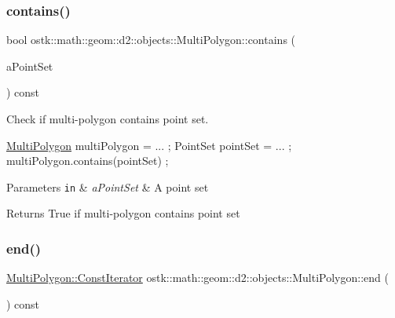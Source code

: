 \subsubsection{\texorpdfstring{contains()}{contains()}\hspace{0.1cm}{\footnotesize\ttfamily [2/2]}}
{\footnotesize\ttfamily bool ostk\+::math\+::geom\+::d2\+::objects\+::\+Multi\+Polygon\+::contains (\begin{DoxyParamCaption}\item[{const \hyperlink{classostk_1_1math_1_1geom_1_1d2_1_1objects_1_1_point_set}{Point\+Set} \&}]{a\+Point\+Set }\end{DoxyParamCaption}) const}



Check if multi-\/polygon contains point set. 


\begin{DoxyCode}
\hyperlink{classostk_1_1math_1_1geom_1_1d2_1_1objects_1_1_multi_polygon_a70327c4d3f7f19f5ae9b32c0a715f1fd}{MultiPolygon} multiPolygon = ... ;
PointSet pointSet = ... ;
multiPolygon.contains(pointSet) ;
\end{DoxyCode}



\begin{DoxyParams}[1]{Parameters}
\mbox{\tt in}  & {\em a\+Point\+Set} & A point set \\
\hline
\end{DoxyParams}
\begin{DoxyReturn}{Returns}
True if multi-\/polygon contains point set 
\end{DoxyReturn}
\mbox{\label{classostk_1_1math_1_1geom_1_1d2_1_1objects_1_1_multi_polygon_a05145ccf3b98e2800287a634bf98e2e6}} 
\subsubsection{\texorpdfstring{end()}{end()}}
{\footnotesize\ttfamily \hyperlink{classostk_1_1math_1_1geom_1_1d2_1_1objects_1_1_multi_polygon_ade3439a576f75f37a3ebf8b4e195bad5}{Multi\+Polygon\+::\+Const\+Iterator} ostk\+::math\+::geom\+::d2\+::objects\+::\+Multi\+Polygon\+::end (\begin{DoxyParamCaption}{ }\end{DoxyParamCaption}) const}



